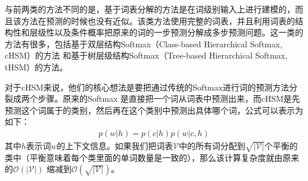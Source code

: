 \documentclass[12pt,a4paper]{article}
\begin{document}
与前两类的方法不同的是，基于词表分解的方法是在词级别输入上进行建模的，而且该方法在预测的时候也没有近似。该类方法使用完整的词表，并且利用词表的结构性和层级性以及条件概率把原来的词的一步预测分解成多步预测问题。这一类的方法有很多，包括基于双层结构Softmax（Class-based Hierarchical Softmax, cHSM）的方法\cite{DBLP:conf/icassp/Goodman01,DBLP:conf/icassp/MikolovKBCK11,DBLP:conf/acl/ChenGA16,DBLP:conf/icml/GraveJCGJ17} 和基于树层级结构Softmax（Tree-based Hierarchical Softmax, tHSM）的方法\cite{DBLP:conf/aistats/MorinB05,DBLP:conf/nips/MnihH08}。

对于cHSM来说，他们的核心想法是要把通过传统的Softmax进行词的预测方法分裂成两个步骤。原来的Softmax 是直接把一个词从词表中预测出来，而cHSM是先预测这个词属于的类别，然后再在这个类别中预测出具体哪个词，公式可以表示为如下：
\begin{equation}
\label{eq:cHSM}
\begin{split}
	p(w|h)=p(c|h)p(w|c,h)
\end{split}
\end{equation}
其中$h$表示词$w$的上下文信息。如果我们把词表$\mathcal{V}$中的所有词分配到${\sqrt{|\mathcal{V}|}}$个平衡的类中（平衡意味着每个类里面的单词数量是一致的），那么该计算复杂度就由原来的${\mathcal{O}(|\mathcal{V}|)}$ 缩减到${\mathcal{O}(\sqrt{|\mathcal{V}|})}$。
\end{document}
